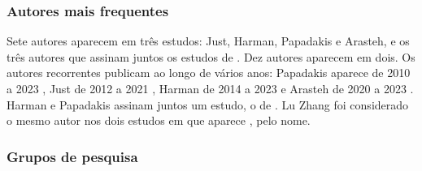 \subsubsection{Autores mais frequentes}
\label{subsubsec:autores-frequentes}

Sete autores aparecem em três estudos: Just, Harman, Papadakis e Arasteh, e os três autores que assinam juntos os estudos de . Dez autores aparecem em dois. Os autores recorrentes publicam ao longo de vários anos: Papadakis aparece de 2010 a 2023 \cite{kintis2010, khanfir2023}, Just de 2012 a 2021 \cite{just2012, petrovic2021}, Harman de 2014 a 2023 \cite{yao2014, ojdanic2023} e Arasteh de 2020 a 2023 \cite{shomali2020, arasteh2023}. Harman e Papadakis assinam juntos um estudo, o de . Lu Zhang foi considerado o mesmo autor nos dois estudos em que aparece \cite{zhang2010, zhang2019}, pelo nome.

\subsubsection{Grupos de pesquisa}
\label{subsubsec:grupos-pesquisa}

